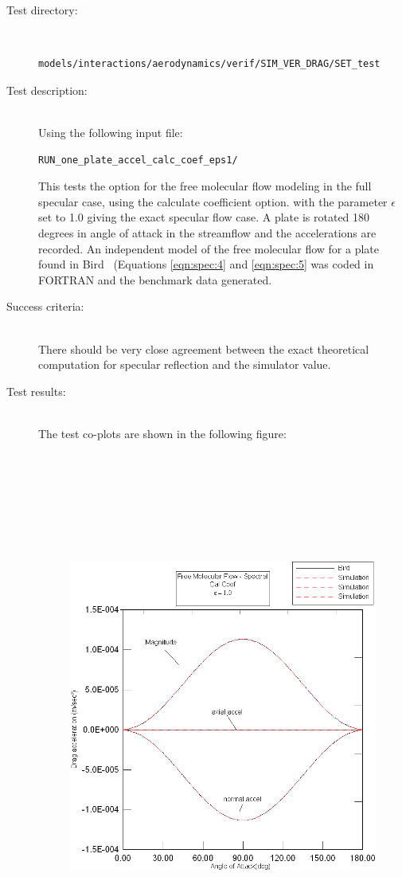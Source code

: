 \label{test:mfs}
\begin{description}
\item[Test directory:] \
\begin{verbatim}models/interactions/aerodynamics/verif/SIM_VER_DRAG/SET_test\end{verbatim}
\item[Test description:] \ \\
Using the following input file:
\begin{verbatim}RUN_one_plate_accel_calc_coef_eps1/\end{verbatim}
This tests the option for the free molecular flow
modeling in the full specular case, using the calculate coefficient option.
with the parameter $\epsilon$ set to 1.0 giving the exact specular flow
case. A plate is rotated 180 degrees in angle of attack in the
streamflow and the accelerations are recorded. An independent model
of the free molecular flow for a plate found in Bird~\cite{Bird} (Equations
\ref{eqn:spec:4} and \ref{eqn:spec:5}
was coded in FORTRAN and the benchmark data generated.
\item[Success criteria:] \ \\
There should be very close agreement between the exact theoretical computation
for specular reflection and the simulator value.
\item[Test results:] \ \\
The test co-plots are shown in the following figure:
\begin{figure}[hbpt]
\includegraphics [height=175mm]{figs/specular_cc.jpg}

\end{figure}
\end{description}
